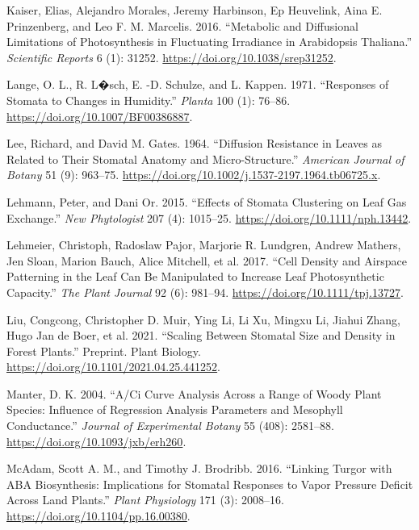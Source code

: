\documentclass[12pt,halfline,a4paper,]{ouparticle}
\newlength{\cslhangindent}
\newlength{\cslentryspacingunit} %
\newenvironment{CSLReferences}[2] %
 {%
  \setlength{\parindent}{0pt}
  \ifodd #1
  \let\oldpar\par
  \def\par{\hangindent=\cslhangindent\oldpar}
  \fi
  \setlength{\parskip}{#2\cslentryspacingunit}
 }%
 {}
\begin{document}
\begin{CSLReferences}{1}{0}
\leavevmode{}%
Kaiser, Elias, Alejandro Morales, Jeremy Harbinson, Ep Heuvelink, Aina
E. Prinzenberg, and Leo F. M. Marcelis. 2016. {``Metabolic and
Diffusional Limitations of Photosynthesis in Fluctuating Irradiance in
{Arabidopsis} Thaliana.''} \emph{Scientific Reports} 6 (1): 31252.
\url{https://doi.org/10.1038/srep31252}.

\leavevmode{}%
Lange, O. L., R. L�sch, E. -D. Schulze, and L. Kappen. 1971.
{``Responses of Stomata to Changes in Humidity.''} \emph{Planta} 100
(1): 76--86. \url{https://doi.org/10.1007/BF00386887}.

\leavevmode{}%
Lee, Richard, and David M. Gates. 1964. {``Diffusion Resistance in
Leaves as Related to Their Stomatal Anatomy and Micro-Structure.''}
\emph{American Journal of Botany} 51 (9): 963--75.
\url{https://doi.org/10.1002/j.1537-2197.1964.tb06725.x}.

\leavevmode{}%
Lehmann, Peter, and Dani Or. 2015. {``Effects of Stomata Clustering on
Leaf Gas Exchange.''} \emph{New Phytologist} 207 (4): 1015--25.
\url{https://doi.org/10.1111/nph.13442}.

\leavevmode{}%
Lehmeier, Christoph, Radoslaw Pajor, Marjorie R. Lundgren, Andrew
Mathers, Jen Sloan, Marion Bauch, Alice Mitchell, et al. 2017. {``Cell
Density and Airspace Patterning in the Leaf Can Be Manipulated to
Increase Leaf Photosynthetic Capacity.''} \emph{The Plant Journal} 92
(6): 981--94. \url{https://doi.org/10.1111/tpj.13727}.

\leavevmode{}%
Liu, Congcong, Christopher D. Muir, Ying Li, Li Xu, Mingxu Li, Jiahui
Zhang, Hugo Jan de Boer, et al. 2021. {``Scaling Between Stomatal Size
and Density in Forest Plants.''} Preprint. Plant Biology.
\url{https://doi.org/10.1101/2021.04.25.441252}.

\leavevmode{}%
Manter, D. K. 2004. {``A/{Ci} Curve Analysis Across a Range of Woody
Plant Species: Influence of Regression Analysis Parameters and Mesophyll
Conductance.''} \emph{Journal of Experimental Botany} 55 (408):
2581--88. \url{https://doi.org/10.1093/jxb/erh260}.

\leavevmode{}%
McAdam, Scott A. M., and Timothy J. Brodribb. 2016. {``Linking {Turgor}
with {ABA} {Biosynthesis}: {Implications} for {Stomatal} {Responses} to
{Vapor} {Pressure} {Deficit} Across {Land} {Plants}.''} \emph{Plant
Physiology} 171 (3): 2008--16.
\url{https://doi.org/10.1104/pp.16.00380}.


\end{CSLReferences}
\end{document}
